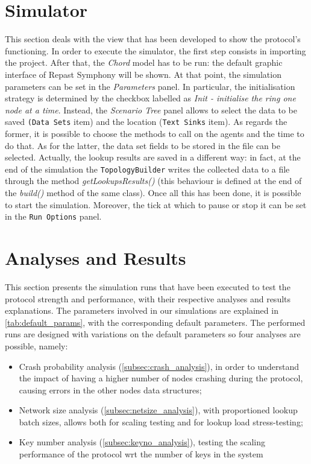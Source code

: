 \documentclass[11pt,twocolumn,letterpaper]{article}
\begin{document}
	\section{Simulator}
	\label{sec:simulator}
	This section deals with the view that has been developed to show the protocol's functioning. \newline
	In order to execute the simulator, the first step consists in importing the project. After that, the \textit{Chord} model has to be run: the default graphic interface of Repast Symphony will be shown. At that point, the simulation parameters can be set in the \textit{Parameters} panel. In particular, the initialisation strategy is determined by the checkbox labelled as \textit{Init - initialise the ring one node at a time}.  Instead, the \textit{Scenario Tree} panel allows to select the data to be saved \texttt{(Data Sets} item) and the location (\texttt{Text Sinks} item). As regards the former, it is possible to choose the methods to call on the agents and the time to do that. As for the latter, the data set fields to be stored in the file can be selected. Actually, the lookup results are saved in a different way: in fact, at the end of the simulation the \texttt{TopologyBuilder} writes the collected data to a file through the method \textit{getLookupsResults()} (this behaviour is defined at the end of the \textit{build()} method of the same class). Once all this has been done, it is possible to start the simulation. Moreover, the tick at which to pause or stop it can be set in the \texttt{Run Options} panel. \newline
	
	\section{Analyses and Results}
	\label{sec:analyses}

	This section presents the simulation runs that have been executed to test the protocol strength and performance, with their respective analyses and results explanations. The parameters involved in our simulations are explained in \cref{tab:default_params}, with the corresponding default parameters. The performed runs are designed with variations on the default parameters so four analyses are possible, namely:
	\begin{itemize}
		\item Crash probability analysis (\cref{subsec:crash_analysis}), in order to understand the impact of having a higher number of nodes crashing during the protocol, causing errors in the other nodes data structures;
		\item Network size analysis (\cref{subsec:netsize_analysis}), with proportioned lookup batch sizes, allows both for scaling testing and for lookup load stress-testing;
		\item Key number analysis (\cref{subsec:keyno_analysis}), testing the scaling performance of the protocol wrt the number of keys in the system
	\end{itemize}
	
\end{document}
